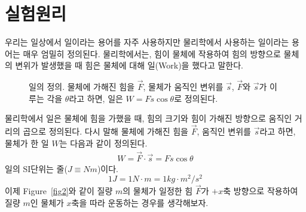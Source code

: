 \documentclass[12pt,a4paper]{article}
\begin{document}
\section{실험원리}
우리는 일상에서 일이라는 용어를 자주 사용하지만 물리학에서 사용하는 일이라는 용어는
매우 엄밀히 정의된다. 물리학에서는, 힘이 물체에 작용하여 힘의 방향으로 물체의 변위가
발생했을 때 힘은 물체에 대해 일(Work)을 했다고 말한다.
\begin{figure}[!h]
    \centering
    \caption{\label{fig1}일의 정의. 물체에 가해진 힘을 $\vec{F}$, 물체가 움직인
        변위를 $\vec{s}$, $\vec{F}$와 $\vec{s}$가 이루는 각을 $\theta$라고 하면,
        일은 $W=Fs\cos{\theta}$로 정의된다.}
\end{figure}
물리학에서 일은 물체에 힘을 가했을 때, 힘의 크기와 힘이 가해진 방향으로 움직인 거리의
곱으로 정의된다. 다시 말해 물체에 가해진 힘을 $\vec{F}$, 움직인 변위를 $\vec{s}$라고
하면, 물체가 한 일 $W$는 다음과 같이 정의된다.
\begin{equation}
    \begin{aligned}
        W=\vec{F}\cdot\vec{s}=Fs\cos{\theta}
        \label{eq1}
    \end{aligned}
\end{equation}
일의 SI단위는 줄($J \equiv Nm$)이다.
$$1J = 1N \cdot m = 1kg \cdot m^2/s^2$$
이제 Figure~\ref{fig2}와 같이 질량 $m$의 물체가 일정한 힘 $\vec{F}$가 $+x$축
방향으로 작용하여 질량 $m$인 물체가 $x$축을 따라 운동하는 경우를 생각해보자.
\end{document}
